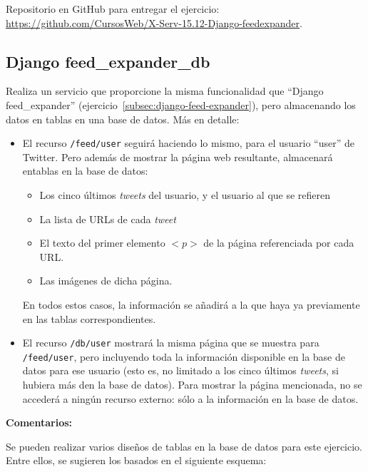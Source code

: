 Repositorio en GitHub para entregar el ejercicio: \\ 
\url{https://github.com/CursosWeb/X-Serv-15.12-Django-feedexpander}.


\subsection{Django feed\_expander\_db}
\label{subsec:django-feed-expander-db}

Realiza un servicio que proporcione la misma funcionalidad que ``Django feed\_expander'' (ejercicio~\ref{subsec:django-feed-expander}), pero almacenando los datos en tablas en una base de datos. Más en detalle:

\begin{itemize}
\item El recurso \verb|/feed/user| seguirá haciendo lo mismo, para el usuario ``user'' de Twitter. Pero además de mostrar la página web resultante, almacenará entablas en la base de datos:

  \begin{itemize}
  \item Los cinco últimos \emph{tweets} del usuario, y el usuario al que se refieren
  \item La lista de URLs de cada \emph{tweet}
  \item El texto del primer elemento $<p>$ de la página referenciada por cada URL.
  \item Las imágenes de dicha página.
  \end{itemize}

En todos estos casos, la información se añadirá a la que haya ya previamente en las tablas correspondientes.

\item El recurso \verb|/db/user| mostrará la misma página que se muestra para \verb|/feed/user|, pero incluyendo toda la información disponible en la base de datos para ese usuario (esto es, no limitado a los cinco últimos \emph{tweets}, si hubiera más den la base de datos). Para mostrar la página mencionada, no se accederá a ningún recurso externo: sólo a la información en la base de datos.
\end{itemize}

\textbf{Comentarios:}

Se pueden realizar varios diseños de tablas en la base de datos para este ejercicio. Entre ellos, se sugieren los basados en el siguiente esquema:

